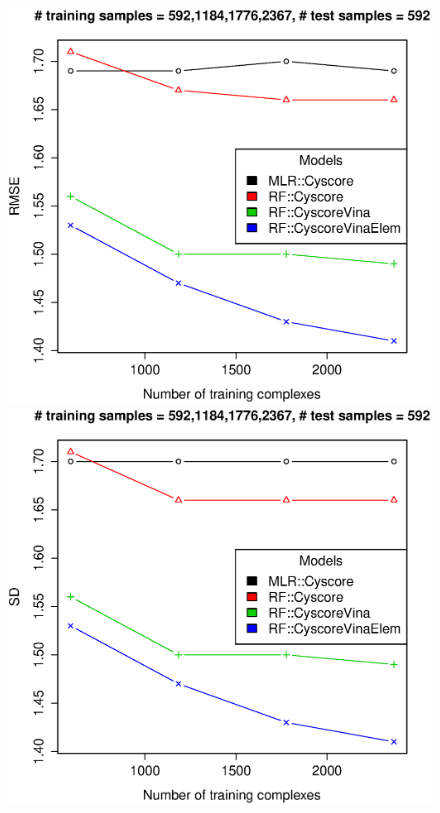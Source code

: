 \documentclass[journal=jacsat,manuscript=article]{achemso}
\begin{document}
\begin{figure}[ht!]
\endminipage
\\
\includegraphics[width=\linewidth]{../rfcyscore/tst-592-rmse.eps}
\endminipage
{}
\includegraphics[width=\linewidth]{../rfcyscore/tst-592-sdev.eps}
\endminipage
{}

\end{figure}
\end{document}
